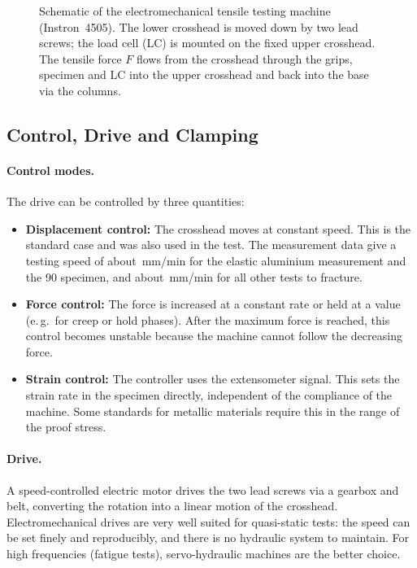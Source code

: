 \documentclass[11pt,a4paper]{article}
\begin{document}
\begin{figure}[H]
\caption{Schematic of the electromechanical tensile testing machine (Instron~4505).
The lower crosshead is moved down by two lead screws; the load cell (LC) is
mounted on the fixed upper crosshead. The tensile force $F$ flows from the
crosshead through the grips, specimen and LC into the upper crosshead and back
into the base via the columns.}
\label{fig:maschine}
\end{figure}

\subsection{Control, Drive and Clamping}

\paragraph{Control modes.} The drive can be controlled by three quantities:
\begin{itemize}[nosep]
  \item \textbf{Displacement control:} The crosshead moves at constant speed.
        This is the standard case and was also used in the test. The
        measurement data give a testing speed of about \RvAluE\,mm/min for the
        elastic aluminium measurement and the 90\textdegree{} specimen, and
        about \RvAluB\,mm/min for all other tests to fracture.
  \item \textbf{Force control:} The force is increased at a constant rate or
        held at a value (e.\,g.\ for creep or hold phases). After the maximum
        force is reached, this control becomes unstable because the machine
        cannot follow the decreasing force.
  \item \textbf{Strain control:} The controller uses the extensometer signal.
        This sets the strain rate in the specimen directly, independent of the
        compliance of the machine. Some standards for metallic materials
        require this in the range of the proof stress.
\end{itemize}

\paragraph{Drive.} A speed-controlled electric motor drives the two lead
screws via a gearbox and belt, converting the rotation into a linear motion of
the crosshead. Electromechanical drives are very well suited for quasi-static
tests: the speed can be set finely and reproducibly, and there is no hydraulic
system to maintain. For high frequencies (fatigue tests), servo-hydraulic
machines are the better choice.
\end{document}
